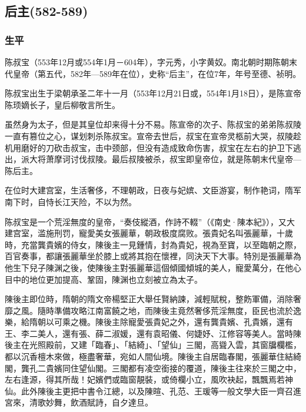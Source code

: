 
\subsection{后主\tiny(582-589)}

\subsubsection{生平}

陈叔宝（553年12月或554年1月－604年），字元秀，小字黄奴。南北朝时期陈朝末代皇帝（第五代，582年—589年在位），史称“后主”，在位7年，年号至德、祯明。

陈叔宝出生于梁朝承圣二年十一月（553年12月21日或，554年1月18日），是陈宣帝陈顼嫡长子，皇后柳敬言所生。

虽然身为太子，但是其皇位却来得十分不易。陈宣帝的次子、陈叔宝的弟弟陈叔陵一直有篡位之心，谋划刺杀陈叔宝。宣帝去世后，叔宝在宣帝灵柩前大哭，叔陵趁机用磨好的刀砍击叔宝，击中颈部，但没有造成致命伤害，叔宝在左右的护卫下逃出，派大将萧摩诃讨伐叔陵。最后叔陵被杀，叔宝即皇帝位，就是陈朝末代皇帝—陈后主。

在位时大建宫室，生活奢侈，不理朝政，日夜与妃嫔、文臣游宴，制作艳词，隋军南下时，自恃长江天险，不以为然。

陈叔宝是一个荒淫無度的皇帝，“奏伎縱酒，作詩不輟”（《南史·陳本紀》），又大建宫室，滥施刑罚，寵愛美女張麗華，朝政极度腐败。張貴妃名叫張麗華，十歲時，充當龔貴嬪的侍女，陳後主一見鍾情，封為貴妃，視為至寶，以至臨朝之際，百官奏事，都讓張麗華坐於膝上或將其抱在懷裡，同決天下大事。特別是張麗華為他生下兒子陳渊之後，使陳後主對張麗華這個傾國傾城的美人，寵愛萬分，在他心目中的地位更加提高、鞏固，陳渊也立刻被立為太子。

陳後主即位時，隋朝的隋文帝楊堅正大舉任賢納諫，減輕賦稅，整飭軍備，消除奢靡之風。隨時準備攻略江南富饒之地，而陳後主竟然奢侈荒淫無度，臣民也流於逸樂，給隋朝以可乘之機。陳後主除寵愛張貴妃之外，還有龔貴嬪、孔貴嬪，還有王、李二美人，還有張、薛二淑媛，還有袁昭儀、何婕妤、江修容等美人。當時陳後主在光照殿前，又建「臨春」、「結綺」、「望仙」三閣，高聳入雲，其窗牖欄檻，都以沉香檀木來做，極盡奢華，宛如人間仙境。陳後主自居臨春閣，張麗華住結綺閣，龔孔二貴嬪同住望仙閣。三閣都有凌空銜接的覆道，陳後主往來於三閣之中，左右逢源，得其所哉！妃嬪們或臨窗靚裝，或倚欄小立，風吹袂起，飄飄焉若神仙。此外陳後主更把中書令江總，以及陳暄、孔范、王瑗等一般文學大臣一齊召進宮來，清歌妙舞，飲酒賦詩，自夕達旦。

